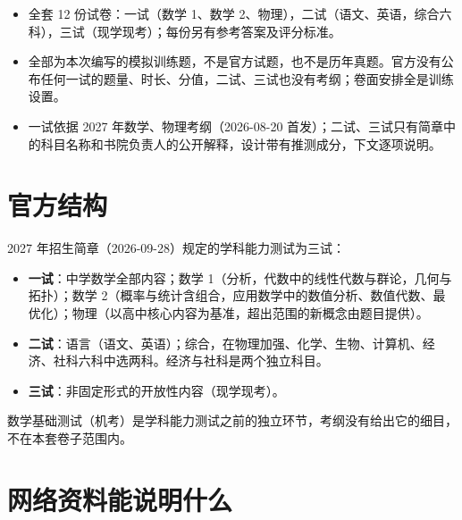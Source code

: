 \documentclass[cjk=noto, nomargin]{mojing-notes}
\institute{训练资料，非官方文件}
\begin{document}
\maketitle
\tableofcontents


\begin{keypoints}
\begin{itemize}
  \item 全套 12 份试卷：一试（数学 1、数学 2、物理），二试（语文、英语，综合六科），三试（现学现考）；每份另有参考答案及评分标准。
  \item 全部为本次编写的模拟训练题，不是官方试题，也不是历年真题。官方没有公布任何一试的题量、时长、分值，二试、三试也没有考纲；卷面安排全是训练设置。
  \item 一试依据 2027 年数学、物理考纲（2026-08-20 首发）；二试、三试只有简章中的科目名称和书院负责人的公开解释，设计带有推测成分，下文逐项说明。
\end{itemize}
\end{keypoints}

\section{官方结构}

2027 年招生简章（2026-09-28）规定的学科能力测试为三试：
\begin{itemize}
  \item \textbf{一试}：中学数学全部内容；数学 1（分析，代数中的线性代数与群论，几何与拓扑）；数学 2（概率与统计含组合，应用数学中的数值分析、数值代数、最优化）；物理（以高中核心内容为基准，超出范围的新概念由题目提供）。
  \item \textbf{二试}：语言（语文、英语）；综合，在物理加强、化学、生物、计算机、经济、社科六科中选两科。经济与社科是两个独立科目。
  \item \textbf{三试}：非固定形式的开放性内容（现学现考）。
\end{itemize}
数学基础测试（机考）是学科能力测试之前的独立环节，考纲没有给出它的细目，不在本套卷子范围内。

\section{网络资料能说明什么}
\end{document}
